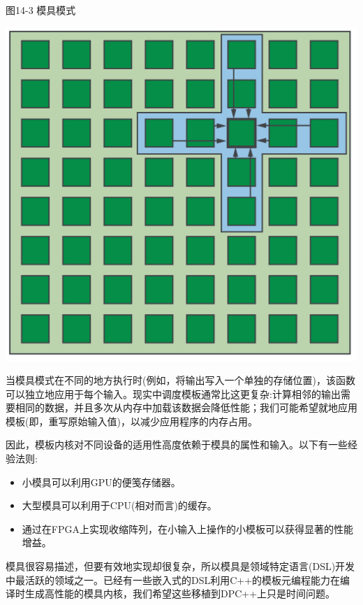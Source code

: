 \hspace*{\fill} \par %
图14-3 模具模式
\begin{center}
	\includegraphics[width=1.\textwidth]{content/chapter-14/images/3}
\end{center}

当模具模式在不同的地方执行时(例如，将输出写入一个单独的存储位置)，该函数可以独立地应用于每个输入。现实中调度模板通常比这更复杂:计算相邻的输出需要相同的数据，并且多次从内存中加载该数据会降低性能；我们可能希望就地应用模板(即，重写原始输入值)，以减少应用程序的内存占用。\par

因此，模板内核对不同设备的适用性高度依赖于模具的属性和输入。以下有一些经验法则:\par

\begin{itemize}
	\item 小模具可以利用GPU的便笺存储器。
	\item 大型模具可以利用于CPU(相对而言)的缓存。
	\item 通过在FPGA上实现收缩阵列，在小输入上操作的小模板可以获得显著的性能增益。
\end{itemize}

模具很容易描述，但要有效地实现却很复杂，所以模具是领域特定语言(DSL)开发中最活跃的领域之一。已经有一些嵌入式的DSL利用C++的模板元编程能力在编译时生成高性能的模具内核，我们希望这些移植到DPC++上只是时间问题。\par


